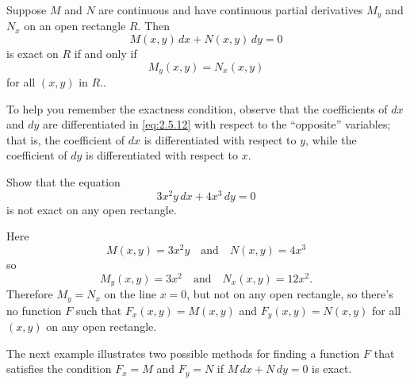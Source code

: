 \documentclass{ximera}
\begin{document}
\begin{theorem}\label{thmtype:2.5.2}
Suppose  $M$ and
$N$ are continuous and have continuous partial derivatives
$M_y$ and $N_x$ on an open rectangle $R.$ Then
$$
M(x,y)\,dx+N(x,y)\,dy=0
$$
is exact on $R$ if and only if
\begin{equation} \label{eq:2.5.12}
M_y(x,y)=N_x(x,y)
\end{equation}
for all $(x,y)$ in  $R.$.
\end{theorem}
 
To help you  remember the exactness condition, observe
that the coefficients of $dx$ and $dy$ are differentiated in
\eqref{eq:2.5.12} with respect to the ``opposite'' variables; that is,
the coefficient of $dx$ is differentiated with respect to $y$, while the
coefficient of $dy$ is differentiated with respect to $x$.
 
\begin{example}\label{example:2.5.2}
 Show that the equation
$$
3x^2y\,dx+4x^3\,dy=0
$$
is not exact on any open rectangle.
 
\begin{explanation}   Here
$$
M(x,y)=3x^2y\quad\mbox{and}\quad N(x,y)=4x^3
$$
so
$$
M_y(x,y)=3x^2 \quad\mbox{and}\quad N_x(x,y)=12 x^2.
$$
Therefore  $M_y=N_x$   on the line $x=0$,
but not on any open rectangle, so
there's no
function $F$ such that $F_x(x,y)=M(x,y)$ and $F_y(x,y)=N(x,y)$
for all $(x,y)$ on any open rectangle.
\end{explanation}
\end{example}
 
The next example illustrates two possible methods for finding a
function $F$ that satisfies the condition $F_x=M$ and $F_y=N$ if
$M\,dx+N\,dy=0 $ is exact.
 
\end{document}
